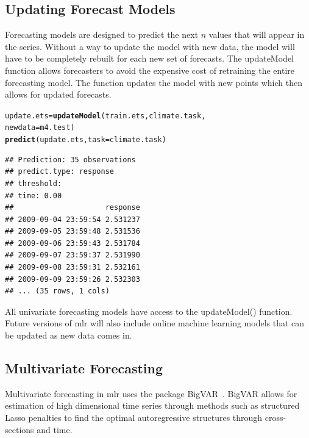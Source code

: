 \documentclass[12pt]{article}\usepackage[]{graphicx}\usepackage[]{color}
\makeatletter
\newcommand{\hlstd}[1]{\textcolor[rgb]{0.345,0.345,0.345}{#1}}%
\newcommand{\hlkwb}[1]{\textcolor[rgb]{0.69,0.353,0.396}{#1}}%
\newcommand{\hlkwc}[1]{\textcolor[rgb]{0.333,0.667,0.333}{#1}}%
\newcommand{\hlkwd}[1]{\textcolor[rgb]{0.737,0.353,0.396}{\textbf{#1}}}%
\newenvironment{kframe}{%
 \def\at@end@of@kframe{}%
 \ifinner\ifhmode%
  \def\at@end@of@kframe{\end{minipage}}%
  \begin{minipage}{\columnwidth}%
 \fi\fi%
 \def\FrameCommand##1{\hskip\@totalleftmargin \hskip-\fboxsep
 \colorbox{shadecolor}{##1}\hskip-\fboxsep
     \hskip-\linewidth \hskip-\@totalleftmargin \hskip\columnwidth}%
 \MakeFramed {\advance\hsize-\width
   \@totalleftmargin\z@ \linewidth\hsize
   \@setminipage}}%
 {\par\unskip\endMakeFramed%
 \at@end@of@kframe}
\newenvironment{knitrout}{}{} %
\theoremstyle{definition}
\newcommand\code{\@codex}
\def\@codex#1{{\normalfont\ttfamily\hyphenchar\font=-1 #1}}
\newcommand{\pkg}[1]{{\fontseries{b}\selectfont #1}}
\makeatother
\begin{document}
\subsection{Updating Forecast Models}

 Forecasting models are designed to predict the next $n$ values that will appear in the series. Without a way to update the model with new data, the model will have to be completely rebuilt for each new set of forecasts. The \code{updateModel} function allows forecasters to avoid the expensive cost of retraining the entire forecasting model. The function updates the model with new points which then allows for updated forecasts.

\singlespacing
\begin{knitrout}
\color{fgcolor}\begin{kframe}
\begin{alltt}
\hlstd{update.ets} \hlkwb{=} \hlkwd{updateModel}\hlstd{(train.ets, climate.task,}
                           \hlkwc{newdata} \hlstd{= m4.test)}
\hlkwd{predict}\hlstd{(update.ets,} \hlkwc{task} \hlstd{= climate.task)}
\end{alltt}
\begin{verbatim}
## Prediction: 35 observations
## predict.type: response
## threshold: 
## time: 0.00
##                     response
## 2009-09-04 23:59:54 2.531237
## 2009-09-05 23:59:48 2.531536
## 2009-09-06 23:59:43 2.531784
## 2009-09-07 23:59:37 2.531990
## 2009-09-08 23:59:31 2.532161
## 2009-09-09 23:59:26 2.532303
## ... (35 rows, 1 cols)
\end{verbatim}
\end{kframe}
\end{knitrout}
\doublespacing

All univariate forecasting models have access to the \code{updateModel()} function. Future versions of \code{mlr} will also include online machine learning models that can be updated as new data comes in.

\subsection{Multivariate Forecasting}
\label{seq:buildAndTuneMulti}

Multivariate forecasting in \pkg{mlr} uses the package \pkg{BigVAR}~\cite{bigvarpaper}. \pkg{BigVAR} allows for estimation of high dimensional time series through methods such as structured Lasso penalties to find the optimal autoregressive structures through cross-sections and time.
\end{document}
